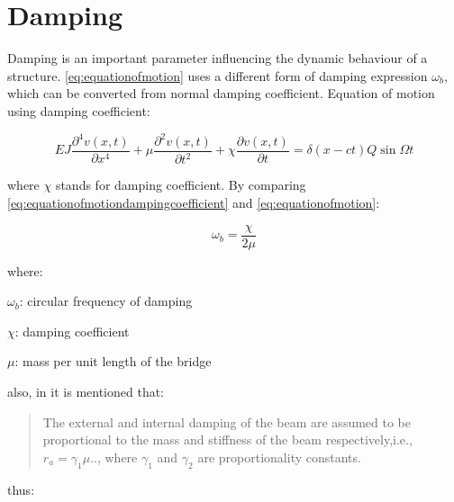 
 


\section{Damping}
Damping is an important parameter influencing the dynamic behaviour of a structure. \ref{eq:equationofmotion} uses a different form of damping expression $\omega_b$, which can be converted from normal damping coefficient. Equation of motion using damping coefficient:

\begin{equation}\label{eq:equationofmotiondampingcoefficient}
    EJ\frac{\partial^4 v(x,t)}{\partial x^4} + \mu\frac{\partial^2 v(x,t)}{\partial t^2} +\chi \frac{\partial v(x,t)}{\partial t} = \delta(x-ct)Q\sin\Omega t 
\end{equation}

where $\chi$ stands for damping coefficient. By comparing \ref{eq:equationofmotiondampingcoefficient} and \ref{eq:equationofmotion}:

\begin{equation}
    \omega_b = \frac{\chi}{2\mu}
\end{equation}

where:

$\omega_b$: circular frequency of damping

$\chi$: damping coefficient

$\mu$: mass per unit length of the bridge

also, in \cite[Page.704]{abu2000vibration} it is mentioned that:

\begin{quote}
    The external and internal damping of the beam are assumed to be proportional to the mass and stiffness of the beam respectively,i.e., $r_a = \gamma_1 \mu$.., where $\gamma_1$ and $\gamma_2$ are proportionality constants.
\end{quote}

thus:


